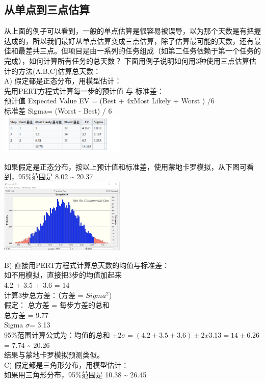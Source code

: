 \hypertarget{ux4eceux5355ux70b9ux52303ux70b9ux4f30ux7b97}{%
\subsection{从单点到三点估算}\label{ux4eceux5355ux70b9ux52303ux70b9ux4f30ux7b97}}

从上面的例子可以看到，一般的单点估算是很容易被误导，以为那个天数是有把握达成的，所以我们最好从单点估算变成三点估算，除了估算最可能的天数，还有最佳和最差共三点。但项目是由一系列的任务组成（如第二任务依赖于第一个任务的完成），如何计算所有任务的总天数？
下面用例子说明如何用3种使用三点估算估计的方法(A,B,C)估算总天数：\\
A) 假定都是正态分布，用模型估计：\\
先用PERT方程式计算每一步的预计值 与 标准差：\\
预计值 Expected Value EV = (Best + 4xMost Likely + Worst ) /6\\
标准差 Sigma= (Worst - Best) / 6\\

\includegraphics[width=6cm]{Screenshotfrom20221215004629.png}

如果假定是正态分布，按以上预计值和标准差，使用蒙地卡罗模拟，从下图可看到，95\%范围是
8.02 \textasciitilde{} 20.37\\

\includegraphics[width=6cm]{pert31.png}

B) 直接用PERT方程式计算总天数的均值与标准差：\\
如不用模拟，直接把3步的均值加起来\\
4.2 + 3.5 + 3.6 = 14\\
计算3步总方差：（方差 = \(Sigma^2\))\\
假定： 总方差 = 每步方差的总和\\
总方差 = 9.77\\
Sigma \(\sigma\)= 3.13\\
95\%范围计算公式为：均值的总和
\(\pm 2 \sigma = (4.2 + 3.5 + 3.6) \pm 2 x 3.13  = 14 \pm 6.26\)= 7.74
\textasciitilde{} 20.26\\
结果与蒙地卡罗模拟预测类似。\\
C) 假定都是三角形分布，用模型估计：\\
如果用三角形分布，95\%范围是 10.38 \textasciitilde{} 26.45\\

